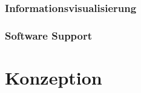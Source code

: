 \documentclass[
	headsepline,
	footsepline,
	fontsize=12pt,
	bibliography=totoc
]{scrbook}
\begin{document}
\subsection{Informationsvisualisierung}
\label{section:informationsvisualisierung}


\subsection{Software Support}
\label{section:software_support}



\chapter{Konzeption}
\label{chapter:konzeption}


\printbibliography[title=Literaturverzeichnis]

\end{document}

